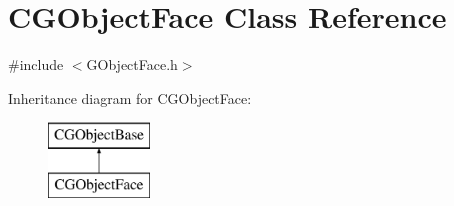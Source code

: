 \hypertarget{class_c_g_object_face}{}\section{C\+G\+Object\+Face Class Reference}
\label{class_c_g_object_face}


{\ttfamily \#include $<$G\+Object\+Face.\+h$>$}

Inheritance diagram for C\+G\+Object\+Face\+:\begin{figure}[H]
\begin{center}
\leavevmode
\includegraphics[height=2.000000cm]{class_c_g_object_face}
\end{center}
\end{figure}
